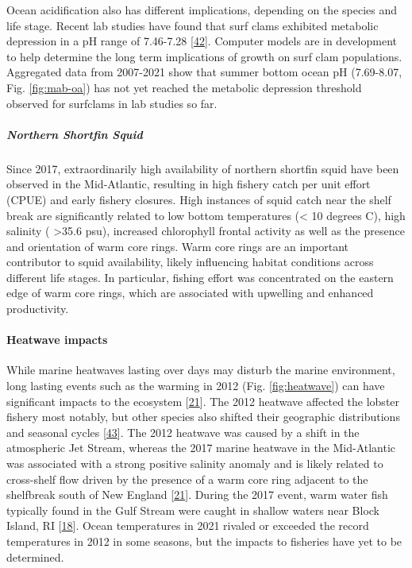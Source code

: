 \documentclass[
  10pt,
]{article}
\begin{document}
Ocean acidification also has different implications, depending on the
species and life stage. Recent lab studies have found that surf clams
exhibited metabolic depression in a pH range of 7.46-7.28
{[}\protect\hyperlink{ref-pousse_energetic_2020}{42}{]}. Computer models
are in development to help determine the long term implications of
growth on surf clam populations. Aggregated data from 2007-2021 show
that summer bottom ocean pH (7.69-8.07, Fig. \ref{fig:mab-oa}) has not
yet reached the metabolic depression threshold observed for surfclams in
lab studies so far.

\hypertarget{northern-shortfin-squid}{%
\subparagraph{\texorpdfstring{\emph{Northern Shortfin
Squid}}{Northern Shortfin Squid}}\label{northern-shortfin-squid}}

Since 2017, extraordinarily high availability of northern shortfin squid
have been observed in the Mid-Atlantic, resulting in high fishery catch
per unit effort (CPUE) and early fishery closures. High instances of
squid catch near the shelf break are significantly related to low bottom
temperatures (\textless{} 10 degrees C), high salinity (
\textgreater35.6 psu), increased chlorophyll frontal activity as well as
the presence and orientation of warm core rings. Warm core rings are an
important contributor to squid availability, likely influencing habitat
conditions across different life stages. In particular, fishing effort
was concentrated on the eastern edge of warm core rings, which are
associated with upwelling and enhanced productivity.

\hypertarget{heatwave-impacts}{%
\paragraph{Heatwave impacts}\label{heatwave-impacts}}

While marine heatwaves lasting over days may disturb the marine
environment, long lasting events such as the warming in 2012 (Fig.
\ref{fig:heatwave}) can have significant impacts to the ecosystem
{[}\protect\hyperlink{ref-gawarkiewicz_characteristics_2019}{21}{]}. The
2012 heatwave affected the lobster fishery most notably, but other
species also shifted their geographic distributions and seasonal cycles
{[}\protect\hyperlink{ref-mills_fisheries_2013}{43}{]}. The 2012
heatwave was caused by a shift in the atmospheric Jet Stream, whereas
the 2017 marine heatwave in the Mid-Atlantic was associated with a
strong positive salinity anomaly and is likely related to cross-shelf
flow driven by the presence of a warm core ring adjacent to the
shelfbreak south of New England
{[}\protect\hyperlink{ref-gawarkiewicz_characteristics_2019}{21}{]}.
During the 2017 event, warm water fish typically found in the Gulf
Stream were caught in shallow waters near Block Island, RI
{[}\protect\hyperlink{ref-gawarkiewicz_changing_2018}{18}{]}. Ocean
temperatures in 2021 rivaled or exceeded the record temperatures in 2012
in some seasons, but the impacts to fisheries have yet to be determined.
\end{document}
